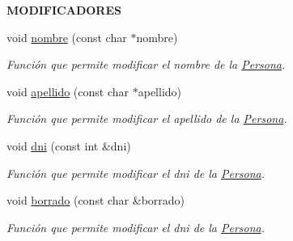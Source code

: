 \begin{Indent}{\bf M\+O\+D\+I\+F\+I\+C\+A\+D\+O\+R\+E\+S}\par
\begin{DoxyCompactItemize}
\item 
void \hyperlink{classedi_1_1Persona_a3c95142ce2b5c59d3ad2a2b50c5973bd}{nombre} (const char $\ast$nombre)
\begin{DoxyCompactList}\small\item\em Función que permite modificar el nombre de la \hyperlink{classedi_1_1Persona}{Persona}. \end{DoxyCompactList}\item 
void \hyperlink{classedi_1_1Persona_ad5c9a9471884a19483b20279935efecc}{apellido} (const char $\ast$apellido)
\begin{DoxyCompactList}\small\item\em Función que permite modificar el apellido de la \hyperlink{classedi_1_1Persona}{Persona}. \end{DoxyCompactList}\item 
void \hyperlink{classedi_1_1Persona_aff4b82748061395c6c169c298fca89b3}{dni} (const int \&dni)
\begin{DoxyCompactList}\small\item\em Función que permite modificar el dni de la \hyperlink{classedi_1_1Persona}{Persona}. \end{DoxyCompactList}\item 
void \hyperlink{classedi_1_1Persona_aa119ea26eeac583304547aee16b15c10}{borrado} (const char \&borrado)
\begin{DoxyCompactList}\small\item\em Función que permite modificar el dni de la \hyperlink{classedi_1_1Persona}{Persona}. \end{DoxyCompactList}\end{DoxyCompactItemize}
\end{Indent}
